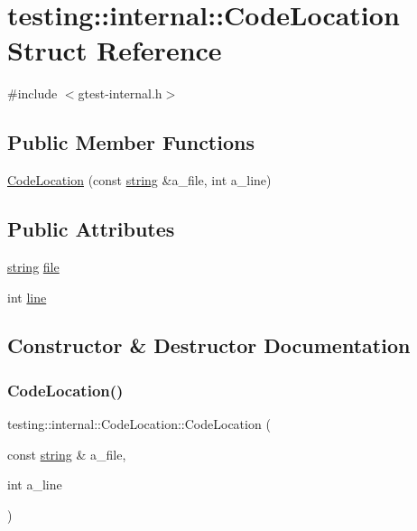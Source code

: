 \hypertarget{structtesting_1_1internal_1_1_code_location}{}\section{testing\+:\+:internal\+:\+:Code\+Location Struct Reference}
\label{structtesting_1_1internal_1_1_code_location}


{\ttfamily \#include $<$gtest-\/internal.\+h$>$}

\subsection*{Public Member Functions}
\begin{DoxyCompactItemize}
\item 
\hyperlink{structtesting_1_1internal_1_1_code_location_ade3ecb2a54905619cd40a6856b48cd5a}{Code\+Location} (const \hyperlink{namespacetesting_1_1internal_a8e8ff5b11e64078831112677156cb111}{string} \&a\+\_\+file, int a\+\_\+line)
\end{DoxyCompactItemize}
\subsection*{Public Attributes}
\begin{DoxyCompactItemize}
\item 
\hyperlink{namespacetesting_1_1internal_a8e8ff5b11e64078831112677156cb111}{string} \hyperlink{structtesting_1_1internal_1_1_code_location_ab8a24d5e63295e411d37578dbb9427c0}{file}
\item 
int \hyperlink{structtesting_1_1internal_1_1_code_location_a01c977c7e8834a05a6d6c40b0c416045}{line}
\end{DoxyCompactItemize}


\subsection{Constructor \& Destructor Documentation}
\mbox{\label{structtesting_1_1internal_1_1_code_location_ade3ecb2a54905619cd40a6856b48cd5a}} 
\subsubsection{\texorpdfstring{Code\+Location()}{CodeLocation()}}
{\footnotesize\ttfamily testing\+::internal\+::\+Code\+Location\+::\+Code\+Location (\begin{DoxyParamCaption}\item[{const \hyperlink{namespacetesting_1_1internal_a8e8ff5b11e64078831112677156cb111}{string} \&}]{a\+\_\+file,  }\item[{int}]{a\+\_\+line }\end{DoxyParamCaption})\hspace{0.3cm}{\ttfamily [inline]}}



